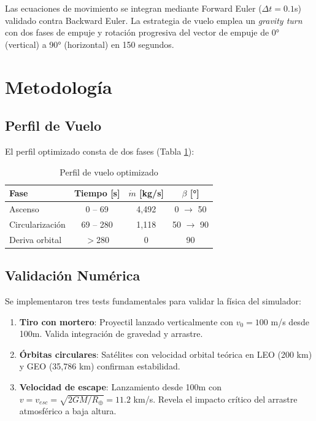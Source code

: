 \documentclass[10pt,a4paper]{article}
\begin{document}
Las ecuaciones de movimiento se integran mediante Forward Euler ($\Delta t = 0.1$s) validado contra Backward Euler. La estrategia de vuelo emplea un \textit{gravity turn} con dos fases de empuje y rotación progresiva del vector de empuje de 0° (vertical) a 90° (horizontal) en 150 segundos.

\section{Metodología}

\subsection{Perfil de Vuelo}
El perfil optimizado consta de dos fases (Tabla \ref{tab:perfil}):

\begin{table}[H]
\centering
\caption{Perfil de vuelo optimizado}
\label{tab:perfil}
\begin{tabular}{@{}lccc@{}}
\toprule
\textbf{Fase} & \textbf{Tiempo [s]} & \textbf{$\dot{m}$ [kg/s]} & \textbf{$\beta$ [°]} \\
\midrule
Ascenso & 0 -- 69 & 4,492 & 0 $\rightarrow$ 50 \\
Circularización & 69 -- 280 & 1,118 & 50 $\rightarrow$ 90 \\
Deriva orbital & $>$280 & 0 & 90 \\
\bottomrule
\end{tabular}
\end{table}

\subsection{Validación Numérica}
Se implementaron tres tests fundamentales para validar la física del simulador:
\begin{enumerate}
    \item \textbf{Tiro con mortero}: Proyectil lanzado verticalmente con $v_0=100$ m/s desde 100m. Valida integración de gravedad y arrastre.
    \item \textbf{Órbitas circulares}: Satélites con velocidad orbital teórica en LEO (200 km) y GEO (35,786 km) confirman estabilidad.
    \item \textbf{Velocidad de escape}: Lanzamiento desde 100m con $v = v_{esc} = \sqrt{2GM/R_\oplus} = 11.2$ km/s. Revela el impacto crítico del arrastre atmosférico a baja altura.
\end{enumerate}
\end{document}
